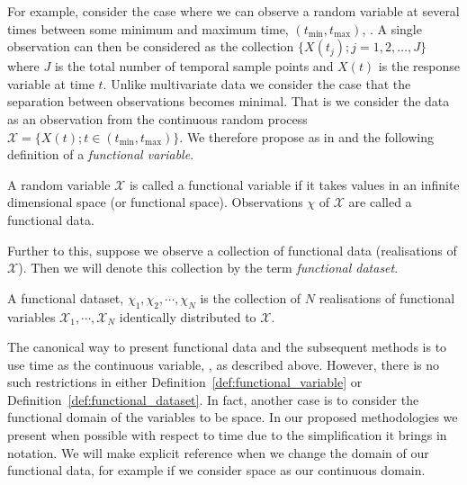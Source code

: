 For example, \citeauthor{ferraty_nonparametric_2006} consider the case where we can observe a random variable at several times between some minimum and maximum time, $\left( t_{\text{min}}, t_{\text{max}} \right)$, \citep{ferraty_nonparametric_2006}.
A single observation can then be considered as the collection $ \{ X(t_j) ; j=1,2,\dots, J\}$ where $J$ is the total number of temporal sample points and $X(t)$ is the response variable at time $t$.
Unlike multivariate data we consider the case that the separation between observations becomes minimal.
That is we consider the data as an observation from the continuous random process $\mathcal{X} = \{X(t); t \in \left( t_\text{min}, t_\text{max} \right)\}$.
We therefore propose as in \citep{ferraty_nonparametric_2006} and \citep{shi_gaussian_2011} the following definition of a \textit{functional variable}.

 \begin{definition}
	A random variable $\mathcal{X}$ is called a functional variable if it takes values in an infinite dimensional space (or functional space). Observations $\chi$ of $\mathcal{X}$ are called a functional data.
	\label{def:functional_variable}
\end{definition}

Further to this, suppose we observe a collection of functional data (realisations of $\mathcal{X}$).
Then we will denote this collection by the term \textit{functional dataset}.

\begin{definition}
	A functional dataset, $\chi_1, \chi_2, \cdots, \chi_N$ is the collection of $N$ realisations of functional variables $\mathcal{X}_1, \cdots, \mathcal{X}_N$ identically distributed to $\mathcal{X}$.
	\label{def:functional_dataset}
\end{definition}

The canonical way to present functional data and the subsequent methods is to use time as the continuous variable, \cite{ramsay_functional_2010, ferraty_nonparametric_2006, shi_gaussian_2011}, as described above.
However, there is no such restrictions in either Definition~\ref{def:functional_variable} or Definition~\ref{def:functional_dataset}. 
In fact, another case is to consider the functional domain of the variables to be space.
In our proposed methodologies we present when possible with respect to time due to the simplification it brings in notation.
We will make explicit reference when we change the domain of our functional data, for example if we consider space as our continuous domain. 

